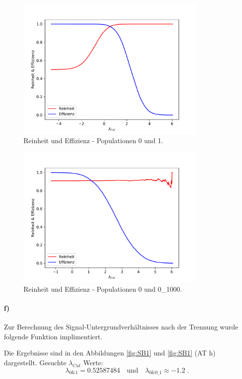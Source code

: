 \begin{figure}
  \centering
  \includegraphics[height = 7cm]{plots/ReinheitEffizienzplot.pdf}
  \caption{Reinheit und Effizienz - Populationen 0 und 1.}
  \label{fig:RE1}
\end{figure}
\begin{figure}
  \centering
  \includegraphics[height = 7cm]{plots/2ReinheitEffizienzplot.pdf}
  \caption{Reinheit und Effizienz - Populationen 0 und 0\_1000.}
  \label{fig:RE2}
\end{figure}
\FloatBarrier
\paragraph{f)}
Zur Berechnung des Signal-Untergrundverhältnisses nach der Trennung wurde folgende Funktion implimentiert.

Die Ergebnisse sind in den Abbildungen \ref{fig:SB1} und \ref{fig:SB1} (AT h) dargestellt.
Gesuchte $\lambda_{Cut}$ Werte:
\begin{equation}
\lambda_{0\&1} = 0.52587484 \quad \text{und} \quad \lambda_{0\&0\_1} \approx -1.2 \; .
\end{equation}


